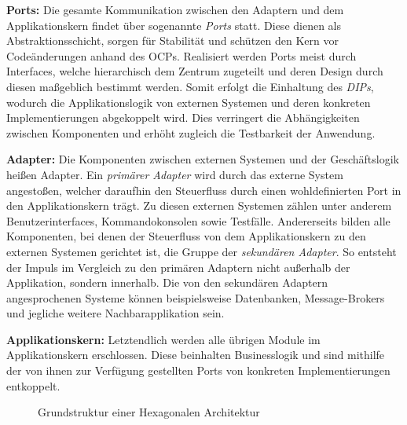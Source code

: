 \textbf{Ports:} Die gesamte Kommunikation zwischen den Adaptern und dem Applikationskern findet über sogenannte \emph{Ports} statt. Diese dienen als Abstraktionsschicht, sorgen für Stabilität und schützen den Kern vor Codeänderungen anhand des \acrlong{OCP}s. Realisiert werden Ports meist durch Interfaces, welche hierarchisch dem Zentrum zugeteilt und deren Design durch diesen maßgeblich bestimmt werden. Somit erfolgt die Einhaltung des \emph{\acrlong{DIP}s}, wodurch die Applikationslogik von externen Systemen und deren konkreten Implementierungen abgekoppelt wird. Dies verringert die Abhängigkeiten zwischen Komponenten und erhöht zugleich die Testbarkeit der Anwendung. \cite{philipbrown.2014}

\textbf{Adapter:} Die Komponenten zwischen externen Systemen und der Geschäftslogik heißen Adapter. Ein \emph{primärer Adapter} wird durch das externe System angestoßen, welcher daraufhin den Steuerfluss durch einen wohldefinierten Port in den Applikationskern trägt. Zu diesen externen Systemen zählen unter anderem Benutzerinterfaces, Kommandokonsolen sowie Testfälle. Andererseits bilden alle Komponenten, bei denen der Steuerfluss von dem Applikationskern zu den externen Systemen gerichtet ist, die Gruppe der \emph{sekundären Adapter}. So entsteht der Impuls im Vergleich zu den primären Adaptern nicht außerhalb der Applikation, sondern innerhalb. Die von den sekundären Adaptern angesprochenen Systeme können beispielsweise Datenbanken, Message-Brokers und jegliche weitere Nachbarapplikation sein.  \cite{hgraca.2017}

\textbf{Applikationskern:} Letztendlich werden alle übrigen Module im Applikationskern erschlossen. Diese beinhalten Businesslogik und sind mithilfe der von ihnen zur Verfügung gestellten Ports von konkreten Implementierungen entkoppelt. 

\begin{figure}[htbp]
	\centering
	
	\caption{Grundstruktur einer Hexagonalen Architektur}
	\label{fig:HexagonaleArchitektur}
\end{figure}

